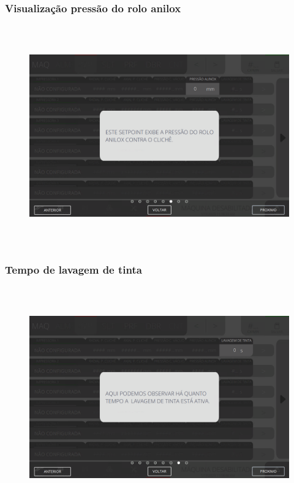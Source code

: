 \newpage
\thispagestyle{fancy}
\vspace*{40 pt}
\subsubsection{\small{Visualização pressão do rolo anilox}}\label{telaAjustesImpressorasVisualizacaoPressaoDoRoloAnilox}
\vspace*{\fill}
\begin{figure}[h]
  \centering
  \includegraphics[width=576px,height=360px]{src/imagesFlexo/04-printter/01-printters/settings/e-6.png}
\end{figure}
\vspace*{\fill}

\newpage
\thispagestyle{fancy}
\vspace*{40 pt}
\subsubsection{\small{Tempo de lavagem de tinta}}\label{telaAjustesImpressorasTempoDeLavagemDeTinta}
\vspace*{\fill}
\begin{figure}[h]
  \centering
  \includegraphics[width=576px,height=360px]{src/imagesFlexo/04-printter/01-printters/settings/e-7.png}
\end{figure}
\vspace*{\fill}

